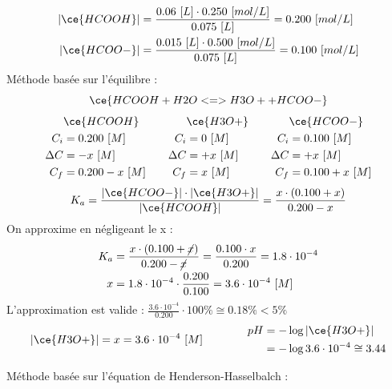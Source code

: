\documentclass[
  11pt,
  a4paper,
  openany]{book}
\begin{document}
\begin{Answer}
\[
\begin{split}
  |\ce{HCOOH}| &= \frac{0.06\ [L] \cdot 0.250\ [mol/L]}{0.075\ [L]} = 0.200\ [mol/L] \\
  |\ce{HCOO-}| &= \frac{0.015\ [L] \cdot 0.500\ [mol/L]}{0.075\ [L]} = 0.100\ [mol/L]
\end{split}
\]
Méthode basée sur l'équilibre :
\[
\ce{HCOOH + H2O <=> H3O+ + HCOO-}
\]
\[
\begin{split}
&\ce{HCOOH}\\
C_i &= 0.200\ [M] \\
\Delta C &= - x\ [M] \\
C_f &= 0.200 - x\ [M] \\
\end{split}
\qquad
\begin{split}
&\ce{H3O+}\\
C_i &= 0\ [M] \\
\Delta C &= + x\ [M] \\
C_f &= x\ [M] \\
\end{split}
\qquad
\begin{split}
&\ce{HCOO-}\\
C_i &= 0.100\ [M] \\
\Delta C &= + x\ [M] \\
C_f &= 0.100 + x\ [M] \\
\end{split}
\]
\[
K_a = \frac{|\ce{HCOO-}| \cdot |\ce{H3O+}|}{|\ce{HCOOH}|} = \frac{x \cdot (0.100 + x)}{0.200 - x}
\]
On approxime en négligeant le x :
\[
\begin{split}
K_a &= \frac{x \cdot (0.100 + \cancel{x})}{0.200 - \cancel{x}} = \frac{0.100 \cdot x}{0.200} = 1.8 \cdot 10^{-4} \\
x &= 1.8 \cdot 10^{-4} \cdot \frac{0.200}{0.100} = 3.6 \cdot 10^{-4}\ [M]
\end{split}
\]
L'approximation est valide : \(\frac{3.6 \cdot 10^{-4}}{0.200} \cdot 100\% \cong 0.18\% < 5\%\)
\[
\begin{split}
|\ce{H3O+}| = x = 3.6 \cdot 10^{-4}\ [M]
\end{split}
\qquad\qquad
\begin{split}
pH &= - \log |\ce{H3O+}| \\
 &= - \log 3.6 \cdot 10^{-4} \cong 3.44
\end{split}
\]

Méthode basée sur l'équation de Henderson-Hasselbalch :


\end{Answer}
\end{document}
